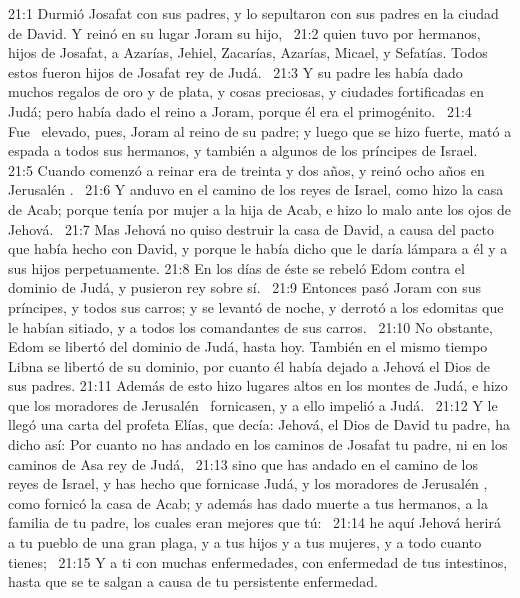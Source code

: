 																					
																					21:1 Durmió Josafat con sus padres, y lo sepultaron con sus padres en la ciudad de David. Y reinó en su lugar Joram su hijo,  
																					21:2 quien tuvo por hermanos, hijos de Josafat, a Azarías, Jehiel, Zacarías, Azarías, Micael, y Sefatías. Todos estos fueron hijos de Josafat rey de Judá.  
																					21:3 Y su padre les había dado muchos regalos de oro y de plata, y cosas preciosas, y ciudades fortificadas en Judá; pero había dado el reino a Joram, porque él era el primogénito.  
																					21:4  Fue  elevado, pues, Joram al reino de su padre; y luego que se hizo fuerte, mató a espada a todos sus hermanos, y también a algunos de los príncipes de Israel.  
																					21:5 Cuando comenzó a reinar era de treinta y dos años, y reinó ocho años en Jerusalén .  
																					21:6 Y anduvo en el camino de los reyes de Israel, como hizo la casa de Acab; porque tenía por mujer a la hija de Acab, e hizo lo malo ante los ojos de Jehová.  
																					21:7 Mas Jehová no quiso destruir la casa de David, a causa del pacto que había hecho con David, y porque le había dicho que le daría lámpara a él y a sus hijos perpetuamente. 
																					21:8 En los días de éste se rebeló Edom contra el dominio de Judá, y pusieron rey sobre sí.  
																					21:9 Entonces pasó Joram con sus príncipes, y todos sus carros; y se levantó de noche, y derrotó a los edomitas que le habían sitiado, y a todos los comandantes de sus carros.  
																					21:10 No obstante, Edom se libertó del dominio de Judá, hasta hoy. También en el mismo tiempo Libna se libertó de su dominio, por cuanto él había dejado a Jehová el Dios de sus padres. 
																					21:11 Además de esto hizo lugares altos en los montes de Judá, e hizo que los moradores de Jerusalén  fornicasen, y a ello impelió a Judá.  
																					21:12 Y le llegó una carta del profeta Elías, que decía: Jehová, el Dios de David tu padre, ha dicho así: Por cuanto no has andado en los caminos de Josafat tu padre, ni en los caminos de Asa rey de Judá,  
																					21:13 sino que has andado en el camino de los reyes de Israel, y has hecho que fornicase Judá, y los moradores de Jerusalén , como fornicó la casa de Acab; y además has dado muerte a tus hermanos, a la familia de tu padre, los cuales eran mejores que tú:  
																					21:14 he aquí Jehová herirá a tu pueblo de una gran plaga, y a tus hijos y a tus mujeres, y a todo cuanto tienes;  
																					21:15 Y a ti con muchas enfermedades, con enfermedad de tus intestinos, hasta que se te salgan a causa de tu persistente enfermedad.  
